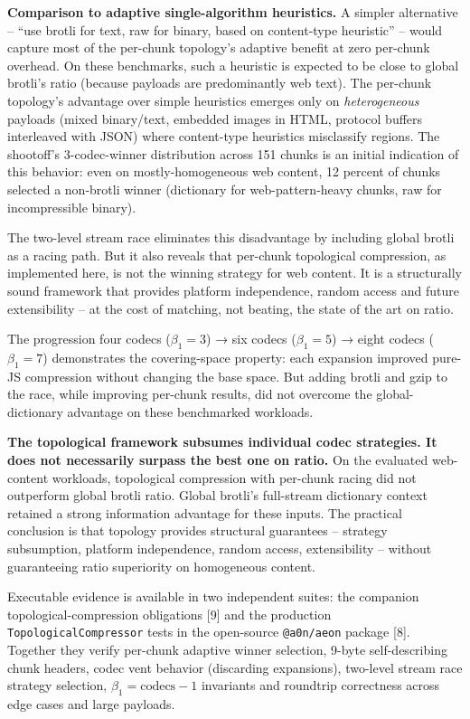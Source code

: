 \documentclass[
  11pt,
]{article}
\begin{document}
\textbf{Comparison to adaptive single-algorithm heuristics.} A simpler
alternative -- ``use brotli for text, raw for binary, based on
content-type heuristic'' -- would capture most of the per-chunk
topology's adaptive benefit at zero per-chunk overhead. On these
benchmarks, such a heuristic is expected to be close to global brotli's
ratio (because payloads are predominantly web text). The per-chunk
topology's advantage over simple heuristics emerges only on
\emph{heterogeneous} payloads (mixed binary/text, embedded images in
HTML, protocol buffers interleaved with JSON) where content-type
heuristics misclassify regions. The shootoff's 3-codec-winner
distribution across 151 chunks is an initial indication of this
behavior: even on mostly-homogeneous web content, 12 percent of chunks
selected a non-brotli winner (dictionary for web-pattern-heavy chunks,
raw for incompressible binary).

The two-level stream race eliminates this disadvantage by including
global brotli as a racing path. But it also reveals that per-chunk
topological compression, as implemented here, is not the winning
strategy for web content. It is a structurally sound framework that
provides platform independence, random access and future extensibility
-- at the cost of matching, not beating, the state of the art on ratio.

The progression four codecs (\(\beta_1 = 3\)) → six codecs
(\(\beta_1 = 5\)) → eight codecs (\(\beta_1 = 7\)) demonstrates the
covering-space property: each expansion improved pure-JS compression
without changing the base space. But adding brotli and gzip to the race,
while improving per-chunk results, did not overcome the
global-dictionary advantage on these benchmarked workloads.

\textbf{The topological framework subsumes individual codec strategies.
It does not necessarily surpass the best one on ratio.} On the evaluated
web-content workloads, topological compression with per-chunk racing did
not outperform global brotli ratio. Global brotli's full-stream
dictionary context retained a strong information advantage for these
inputs. The practical conclusion is that topology provides structural
guarantees -- strategy subsumption, platform independence, random
access, extensibility -- without guaranteeing ratio superiority on
homogeneous content.

Executable evidence is available in two independent suites: the
companion topological-compression obligations {[}9{]} and the production
\texttt{TopologicalCompressor} tests in the open-source
\texttt{@a0n/aeon} package {[}8{]}. Together they verify
per-chunk adaptive winner selection, 9-byte self-describing chunk
headers, codec vent behavior (discarding expansions), two-level stream
race strategy selection, \(\beta_1 = \text{codecs} - 1\) invariants and
roundtrip correctness across edge cases and large payloads.
\end{document}

